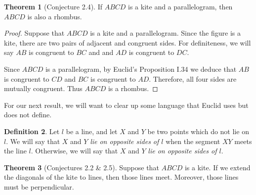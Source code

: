 \documentclass{tufte-handout}
\theoremstyle{definition}
\newtheorem{theorem}{Theorem}[section]
\newtheorem{definition}[theorem]{Definition}
\begin{document}
\begin{theorem}[Conjecture 2.4] \label{theorem:kites-4}
If $ABCD$ is a kite and a parallelogram, then $ABCD$ is also a rhombus.
\end{theorem}

\begin{proof}
Suppose that $ABCD$ is a kite and a parallelogram. Since the figure is a kite, there are two pairs of adjacent and congruent sides. For definiteness, we will say $AB$ is congruent to $BC$ and and $AD$ is congruent to $DC$.



Since $ABCD$ is a parallelogram, by Euclid's Proposition I.34 we deduce that $AB$ is congruent to $CD$ and $BC$ is congruent to $AD$. Therefore, all four sides are mutually congruent. Thus $ABCD$ is a rhombus.
\end{proof}

\clearpage

For our next result, we will want to clear up some language that Euclid uses but does not define.

\begin{definition}\label{definition:same-opp-side}
Let $l$ be a line, and let $X$ and $Y$ be two points which do not lie on $l$. We will say that $X$ and $Y$ \emph{lie on opposite sides of $l$} when the segment $XY$ meets the line $l$. Otherwise, we will say that $X$ and $Y$ \emph{lie on opposite sides of $l$}.
\end{definition}



\begin{theorem}[Conjectures 2.2 \& 2.5]\label{theorem:kites-5}
Suppose that $ABCD$ is a kite. If we extend the diagonals of the kite to lines, then those lines meet. Moreover, those lines must be perpendicular.
\end{theorem}
\end{document}
